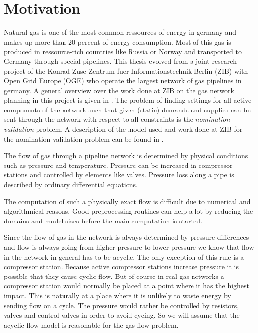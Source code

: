 \section{Motivation}
Natural gas is one of the most common ressources of energy in germany and makes up more than 20 percent of energy 
consumption. Most of this gas is produced in ressource-rich countries like Russia or Norway and transported to Germany 
through special pipelines. 
This thesis evolved from a joint research project of the Konrad Zuse Zentrum fuer Informationstechnik Berlin (ZIB) with 
Open Grid Europe (OGE) who operate the largest network of gas pipelines in germany. 
A general overview over the work done at ZIB on the gas network planning in this project is given in 
\cite{FuegenschuhGeisslerGollmeretal.2013}. The problem of finding settings for all active components of the network 
such that given (static) demands and supplies can be sent through the network with respect to all constraints is the 
\textit{nomination validation} problem. A description of the model used and work done at ZIB for the nomination 
validation problem can be found in \cite{PfetschFuegenschuhGeissleretal.2012}. 

The flow of gas through a pipeline network is determined by physical conditions such as pressure and temperature. 
Pressure can be increased in compressor stations and controlled by elements like valves. Pressure loss along a pipe is 
described by ordinary differential equations. 

The computation of such a physically exact flow is difficult due to numerical and algorithmical reasons. Good 
preprocessing routines can help a lot by reducing the domains and model sizes before the main computation is started.

Since the flow of gas in the network is always determined by pressure differences and flow is always going from higher 
pressure to lower pressure we know that flow in the network in general has to be acyclic. The only exception of this 
rule is a compressor station. Because active compressor stations increase
pressure it is possible that they cause cyclic flow. But of course in real gas networks a compressor station would 
normally be placed at a point where it has the highest impact. This is naturally at a place where it is unlikely to 
waste energy by sending flow on a cycle. The pressure would rather be controlled by resistors, valves and control valves 
in order to avoid cycing. So we will assume that the acyclic flow model is reasonable for the gas flow problem.\\

